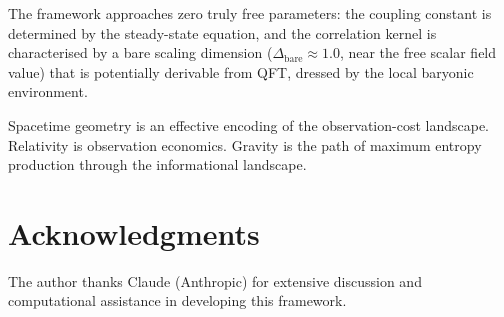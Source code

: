 \documentclass[12pt,a4paper]{article}
\begin{document}
The framework approaches zero truly free parameters: the coupling constant is determined by the steady-state equation, and the correlation kernel is characterised by a bare scaling dimension ($\Delta_{\mathrm{bare}} \approx 1.0$, near the free scalar field value) that is potentially derivable from QFT, dressed by the local baryonic environment.

Spacetime geometry is an effective encoding of the observation-cost landscape. Relativity is observation economics. Gravity is the path of maximum entropy production through the informational landscape.

\section*{Acknowledgments}
The author thanks Claude (Anthropic) for extensive discussion and computational assistance in developing this framework.
\end{document}
